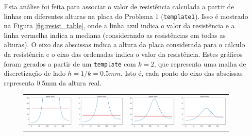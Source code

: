 \documentclass{aleph-revista}
\begin{document}
Esta análise foi feita para associar o valor de resistência calculada a partir de linhas em diferentes alturas na placa do Problema 1 (\texttt{template1}). Isso é mostrado na Figura \ref{fig:resist_table}, onde a linha azul indica o valor da resistência e a linha vermelha indica a mediana (considerando as resistências em todas as alturas). O eixo das abscissas indica a altura da placa considerada para o cálculo da resistência e o eixo das ordenadas indica o valor da resistência. Estes gráficos foram gerados a partir de um \texttt{template} com $k=2$, que representa uma malha de discretização de lado $h=1/k=0.5 mm$. Isto é, cada ponto do eixo das abscissas representa 0.5mm da altura real.

\bigskip

\begin{figure}[!ht]
  \begin{tabular}{cccc}
    \includegraphics[width=0.22\linewidth]{res_1000}  &
    \includegraphics[width=0.22\linewidth]{res_2000}  &
    \includegraphics[width=0.22\linewidth]{res_3000}  &
    \includegraphics[width=0.22\linewidth]{res_4000}    \\


\end{tabular}
\end{figure}
\end{document}
